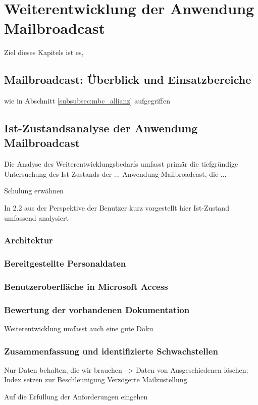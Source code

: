 \section{Weiterentwicklung der Anwendung Mailbroadcast}
\label{sec:praxis}
Ziel dieses Kapitels ist es, 


\subsection{Mailbroadcast: Überblick und Einsatzbereiche}
wie in Abschnitt \ref{subsubsec:mbc_allianz} aufgegriffen


\cite{mbcSchulung}

\subsection{Ist-Zustandsanalyse der Anwendung Mailbroadcast}
Die Analyse des Weiterentwicklungsbedarfs umfasst primär die tiefgründige Untersuchung des Ist-Zustands der ... Anwendung Mailbroadcast, die ...

Schulung erwähnen

In 2.2 aus der Perspektive der Benutzer kurz vorgestellt hier Ist-Zustand umfassend analysiert

\subsubsection{Architektur}
\subsubsection{Bereitgestellte Personaldaten}
\subsubsection{Benutzeroberfläche in Microsoft Access}
\subsubsection{Bewertung der vorhandenen Dokumentation}
Weiterentwicklung umfasst auch eine gute Doku
\subsubsection{Zusammenfassung und identifizierte Schwachstellen}
Nur Daten behalten, die wir brauchen --> Daten von Ausgeschiedenen löschen; Index setzen zur Beschleunigung
Verzögerte Mailzustellung

Auf die Erfüllung der Anforderungen eingehen

